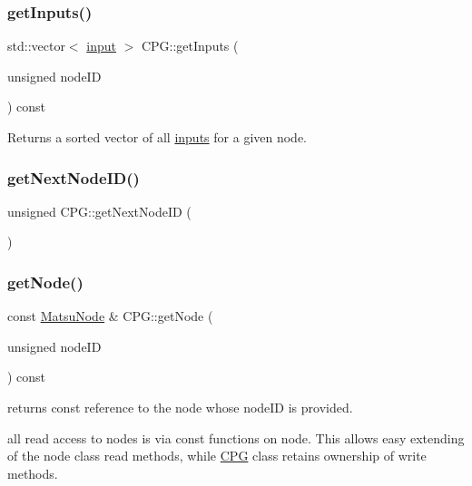 \mbox{\label{classCPG_a78702e3e28d7d70f4a4da93fe4aa2840}} 
\subsubsection{\texorpdfstring{get\+Inputs()}{getInputs()}}
{\footnotesize\ttfamily std\+::vector$<$ \mbox{\hyperlink{structCPG_1_1input}{input}} $>$ C\+P\+G\+::get\+Inputs (\begin{DoxyParamCaption}\item[{unsigned}]{node\+ID }\end{DoxyParamCaption}) const}



Returns a sorted vector of all \mbox{\hyperlink{structCPG_1_1input}{inputs}} for a given node. 

\mbox{\label{classCPG_aa36545f77f1e3b6161bb00ff525ddc12}} 
\subsubsection{\texorpdfstring{get\+Next\+Node\+I\+D()}{getNextNodeID()}}
{\footnotesize\ttfamily unsigned C\+P\+G\+::get\+Next\+Node\+ID (\begin{DoxyParamCaption}{ }\end{DoxyParamCaption})}

\mbox{\label{classCPG_a1c35e3f15f24e2017bb4db7d3ac62a35}} 
\subsubsection{\texorpdfstring{get\+Node()}{getNode()}}
{\footnotesize\ttfamily const \mbox{\hyperlink{classMatsuNode}{Matsu\+Node}} \& C\+P\+G\+::get\+Node (\begin{DoxyParamCaption}\item[{unsigned}]{node\+ID }\end{DoxyParamCaption}) const}



returns const reference to the node whose node\+ID is provided. 

all read access to nodes is via const functions on node. This allows easy extending of the node class\textquotesingle{} read methods, while \mbox{\hyperlink{classCPG}{C\+PG}} class retains ownership of write methods. \mbox{\label{classCPG_abb0f92255cc444320dab811c031f9e3c}} 
